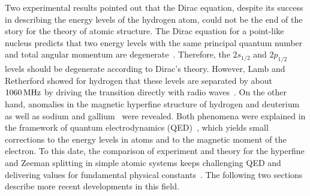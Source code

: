 Two experimental results pointed out that the Dirac equation, despite its success in describing the energy levels of the hydrogen atom, could not be the end of the story for the theory of atomic structure. 
The Dirac equation for a point-like nucleus predicts that two energy levels with the same principal quantum number and total angular momentum are degenerate~\cite{greiner2000}. Therefore, the $2s_{1/2}$ and $2p_{1/2}$ levels should be degenerate according to Dirac's theory. However, Lamb and Retherford showed for hydrogen that these levels are separated by about $1060\,\rm{MHz}$ by driving the transition directly with radio waves~\cite{lamb1947}. On the other hand, anomalies in the magnetic hyperfine structure of hydrogen and deuterium~\cite{nafe1947} as well as sodium and gallium~\cite{kusch1947,kusch1948} were revealed. Both phenomena were explained in the framework of quantum electrodynamics (QED)~\cite{schwinger1948}, which yields small corrections to the energy levels in atoms and to the magnetic moment of the electron. To this date, the comparison of experiment and theory for the hyperfine and Zeeman splitting in simple atomic systems keeps challenging QED and delivering values for fundamental physical constants~\cite{haensch1979}. The following two sections describe more recent developments in this field.

